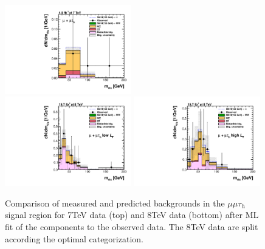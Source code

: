 \begin{figure}
\begin{center}
  \includegraphics[width=0.49\textwidth]{4_Analisys/pics/postfit/mmt_postfit_7TeV_FitAllChannels.pdf}\\
  \includegraphics[width=0.49\textwidth]{4_Analisys/pics/postfit/mmt_low_postfit_8TeV_FitAllChannels.pdf}
  \includegraphics[width=0.49\textwidth]{4_Analisys/pics/postfit/mmt_high_postfit_8TeV_FitAllChannels.pdf}\\
  \caption{Comparison of measured and predicted backgrounds in the $\mu\mu\tau_h$ signal region for 7TeV data (top) and 8TeV data (bottom) after ML fit of the components to the observed data. The 8TeV data are split according the optimal categorization.}
  \label{fig:LLT_mmt_postfit}
\end{center}
\end{figure}

